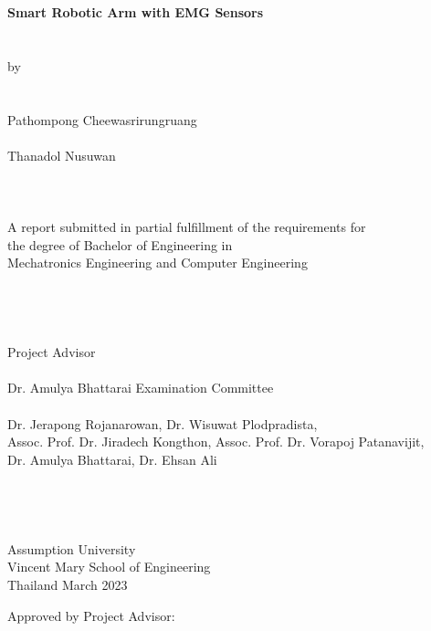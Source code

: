\documentclass[12pt]{article}
\begin{document}
\graphicspath{ {D:/LaTex Saves/Images} }
    \begin{center}
        \large \textbf{Smart Robotic Arm with EMG Sensors} 
        \\~\\~\\
        \normalsize
        by
        \\~\\~\\
        Pathompong Cheewasrirungruang
        \\~\\
        Thanadol Nusuwan
        \\~\\~\\~\\
        A report submitted in partial fulfillment of the requirements for
        \\
        the degree of Bachelor of Engineering in
        \\
        Mechatronics Engineering and Computer Engineering
        \\~\\~\\~\\~\\
        Project Advisor
        \\~\\
        Dr. Amulya Bhattarai
        \break\break\break
        Examination Committee
        \\~\\
        Dr. Jerapong Rojanarowan, Dr. Wisuwat Plodpradista,
        \\
        Assoc. Prof. Dr. Jiradech Kongthon, Assoc. Prof. Dr. Vorapoj Patanavijit,
        \\
        Dr. Amulya Bhattarai, Dr. Ehsan Ali
        \\~\\~\\~\\~\\
        Assumption University
        \\
        Vincent Mary School of Engineering
        \\
        Thailand
        \break
        March 2023
    \end{center}
    \newpage
    \vspace*{\fill}
    \begin{flushleft}
        Approved by Project Advisor:
    \end{flushleft}
\end{document}
